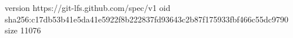 version https://git-lfs.github.com/spec/v1
oid sha256:c17db53b41e5da41e5922f8b222837fd93643c2b87f175933fbf466c55dc9790
size 11076
